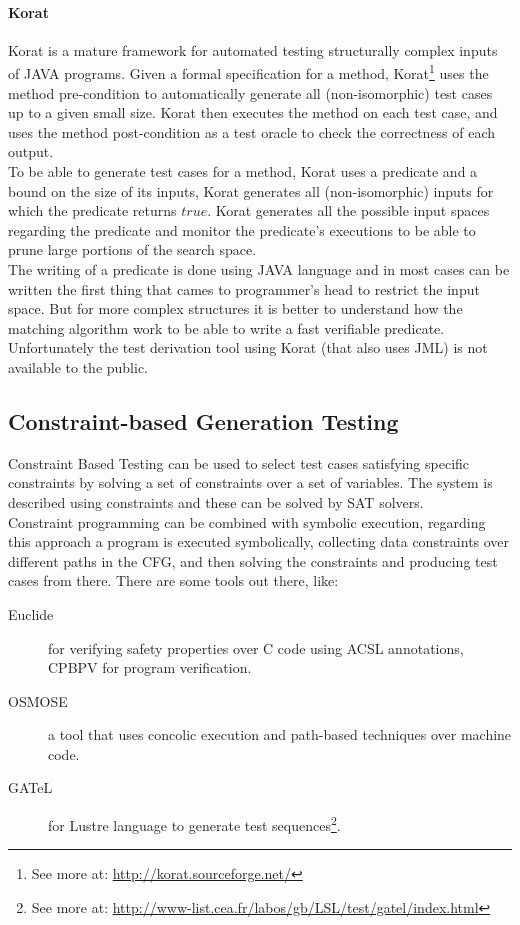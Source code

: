 \paragraph{Korat}
Korat\cite{Boyapati02korat:automated} is a mature framework for automated testing structurally complex inputs of JAVA programs.
Given a formal specification for a method, Korat\footnote{See more at: \url{http://korat.sourceforge.net/}} uses the method pre-condition
to automatically generate all (non-isomorphic) test cases up to a given small size.
Korat then executes the method on each test case, and uses the method post-condition as a test oracle to check the correctness of each output.\\
To be able to generate test cases for a method, Korat uses a predicate and a bound on the size of its inputs,
Korat generates all (non-isomorphic) inputs for which the predicate returns $true$.
Korat generates all the possible input spaces regarding the predicate and monitor the predicate's executions to be able to prune large portions of the search space.\\
\indent The writing of a predicate is done using JAVA language and in most cases can be written the first thing that cames to programmer's head to restrict the input space.
But for more complex structures it is better to understand how the matching algorithm work to be able to write a fast verifiable predicate.\\
Unfortunately the test derivation tool using Korat (that also uses \ac{JML}) is not available to the public.

\subsection{Constraint-based Generation Testing}
Constraint Based Testing\cite{DeMillo91constraint-basedautomatic} can be used to select test cases satisfying specific constraints by
solving a set of constraints over a set of variables. The system is described using constraints and these can be solved by \ac{SAT} solvers.\\
Constraint programming can be combined with symbolic execution, regarding this approach a program is executed symbolically,
collecting data constraints over different paths in the \ac{CFG}, and then solving the constraints and producing test cases from there.
There are some tools out there, like:

\begin{description}
\item[Euclide] for verifying safety properties over C code using \ac{ACSL} annotations, CPBPV for program verification.
\item[OSMOSE] a tool that uses concolic execution and path-based techniques over machine code.
\item[GATeL] for Lustre language to generate test sequences\footnote{See more at: \url{http://www-list.cea.fr/labos/gb/LSL/test/gatel/index.html}}.
\end{description}

